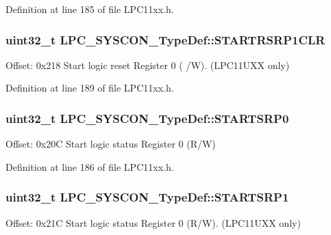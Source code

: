 Definition at line 185 of file L\+P\+C11xx.\+h.

\subsubsection[{\texorpdfstring{S\+T\+A\+R\+T\+R\+S\+R\+P1\+C\+LR}{STARTRSRP1CLR}}]{ uint32\+\_\+t L\+P\+C\+\_\+\+S\+Y\+S\+C\+O\+N\+\_\+\+Type\+Def\+::\+S\+T\+A\+R\+T\+R\+S\+R\+P1\+C\+LR}\hypertarget{group___l_p_c11xx___definitions_ga4cdc080e24dee708eae9cd43d9d9ea29}{}\label{group___l_p_c11xx___definitions_ga4cdc080e24dee708eae9cd43d9d9ea29}
Offset\+: 0x218 Start logic reset Register 0 ( /W). (L\+P\+C11\+U\+XX only) 

Definition at line 189 of file L\+P\+C11xx.\+h.

\subsubsection[{\texorpdfstring{S\+T\+A\+R\+T\+S\+R\+P0}{STARTSRP0}}]{ uint32\+\_\+t L\+P\+C\+\_\+\+S\+Y\+S\+C\+O\+N\+\_\+\+Type\+Def\+::\+S\+T\+A\+R\+T\+S\+R\+P0}\hypertarget{group___l_p_c11xx___definitions_ga3c4af7c32837d8f9c4f299215c6b656d}{}\label{group___l_p_c11xx___definitions_ga3c4af7c32837d8f9c4f299215c6b656d}
Offset\+: 0x20C Start logic status Register 0 (R/W) 

Definition at line 186 of file L\+P\+C11xx.\+h.

\subsubsection[{\texorpdfstring{S\+T\+A\+R\+T\+S\+R\+P1}{STARTSRP1}}]{ uint32\+\_\+t L\+P\+C\+\_\+\+S\+Y\+S\+C\+O\+N\+\_\+\+Type\+Def\+::\+S\+T\+A\+R\+T\+S\+R\+P1}\hypertarget{group___l_p_c11xx___definitions_ga29fb26095e712d2e565e49ae4833ee4e}{}\label{group___l_p_c11xx___definitions_ga29fb26095e712d2e565e49ae4833ee4e}
Offset\+: 0x21C Start logic status Register 0 (R/W). (L\+P\+C11\+U\+XX only) 

